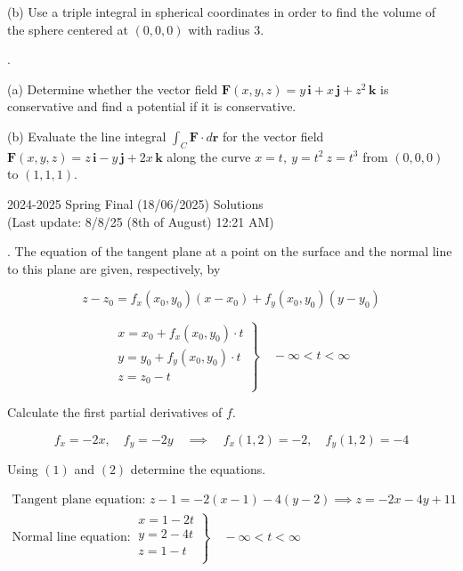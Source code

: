 \documentclass{article}
\begin{document}
\hfill

\noindent (b) Use a triple integral in spherical coordinates in order to find the volume of the sphere centered at $(0,0,0)$ with radius $3$.

\hfill

.

\hfill

\noindent (a) Determine whether the vector field $\mathbf{F}(x,y,z)=y\,\mathbf{i}+x\,\mathbf{j}+z^2\,\mathbf{k}$ is conservative and find a potential if it is conservative.

\hfill

\noindent (b) Evaluate the line integral $\int_C\mathbf{F}\cdot d\mathbf{r}$ for the vector field $\mathbf{F}(x,y,z)=z\,\mathbf{i}-y\,\mathbf{j}+2x\,\mathbf{k}$ along the curve $x=t,\:y=t^2\:z=t^3$ from $(0,0,0)$ to $(1,1,1)$.

\newpage

\begin{center}
2024-2025 Spring Final (18/06/2025) Solutions\\
(Last update: 8/8/25 (8th of August) 12:21 AM)
\end{center}

. The equation of the tangent plane at a point on the surface and the normal line to this plane are given, respectively, by

\begin{equation}z-z_0=f_x(x_0,y_0)(x-x_0)+f_y(x_0,y_0)(y-y_0)\end{equation}

\begin{equation}
\left.\begin{array}{c}
x=x_0+f_x(x_0,y_0)\cdot t\\
y=y_0+f_y(x_0,y_0)\cdot t\\
z=z_0- t\\
\end{array}\right\}\quad-\infty<t<\infty
\end{equation}

\hfill

\noindent Calculate the first partial derivatives of $f$.

\[f_x=-2x,\quad f_y=-2y\quad\implies\quad f_x(1,2)=-2,\quad f_y(1,2)=-4\]

\hfill

\noindent Using $(1)$ and $(2)$ determine the equations.

\[\boxed{\begin{array}{l}
\text{Tangent plane equation: } z-1=-2(x-1)-4(y-2)\implies z=-2x-4y+11\\[1em]
\text{Normal line equation:}\:\left.\begin{array}{l}
x=1-2t\\
y=2-4t\\
z=1-t\\
\end{array}\right\}\quad-\infty<t<\infty
\end{array}
}
\]
\end{document}
